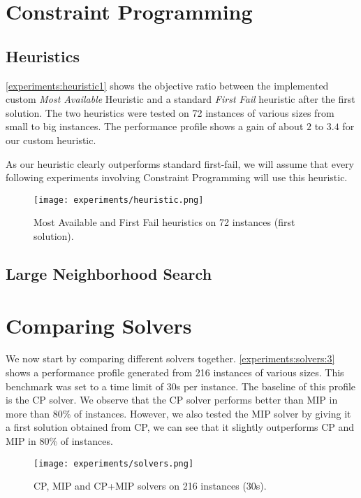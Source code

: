 \documentclass[../../thesis.tex]{subfiles}
\begin{document}
\section{Constraint Programming}

\subsection{Heuristics}

\autoref{experiments:heuristic1} shows the objective ratio between the implemented custom \textit{Most Available} Heuristic and a standard 
\textit{First Fail} heuristic after the first solution. The two heuristics were tested on 72 instances of various sizes from small to big instances.
The performance profile shows a gain of about $2$ to $3.4$ for our custom heuristic.


As our heuristic clearly outperforms standard first-fail, we will assume that every following experiments involving Constraint Programming will use this heuristic.

\begin{figure}
  \centering
  \texttt{[image: experiments/heuristic.png]}
  \caption{Most Available and First Fail heuristics on 72 instances (first solution).}
  \label{experiments:heuristic1}
\end{figure}

\subsection{Large Neighborhood Search}


\section{Comparing Solvers}

We now start by comparing different solvers together. \autoref{experiments:solvers:3} 
shows a performance profile generated from 216 instances of various sizes.
This benchmark was set to a time limit of 30s per instance. The baseline of this 
profile is the CP solver. We observe that the CP solver performs better than MIP in more than 80\% of instances.
However, we also tested the MIP solver by giving it a first solution obtained from CP, we can see that it slightly outperforms CP and MIP in 80\% of instances.

\begin{figure}
  \centering
  \texttt{[image: experiments/solvers.png]}
  \caption{CP, MIP and CP+MIP solvers on 216 instances (30s).}
  \label{experiments:solvers:3}
\end{figure}
\end{document}

